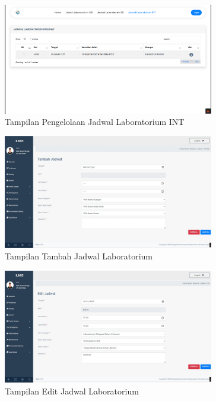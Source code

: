 \begin{figure}
	\centering
	\includegraphics[width=0.82\textwidth]{konten/gambar/hasil/labor-int.png}
	\caption{Tampilan Pengelolaan Jadwal Laboratorium INT}
	\label{fig:jadwal-int}
\end{figure}

\begin{figure}
	\centering
	\includegraphics[width=0.82\textwidth]{konten/gambar/hasil/tambah-jadwal.jpeg}
	\caption{Tampilan Tambah Jadwal Laboratorium}
	\label{fig:tambah-jadwal}
\end{figure}

\begin{figure}
	\centering
	\includegraphics[width=0.82\textwidth]{konten/gambar/hasil/edit-jadwal.jpeg}
	\caption{Tampilan Edit Jadwal Laboratorium}
	\label{fig:edit-jadwal}
\end{figure}

